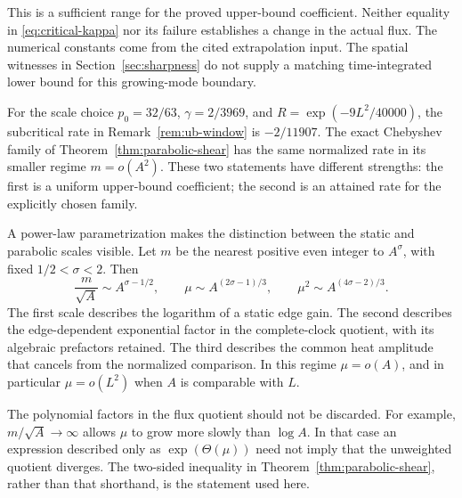 This is a sufficient range for the proved upper-bound coefficient.
Neither equality in \eqref{eq:critical-kappa} nor its failure establishes
a change in the actual flux. The numerical constants come from the cited
extrapolation input. The spatial witnesses in
Section~\ref{sec:sharpness} do not supply a matching time-integrated
lower bound for this growing-mode boundary.

For the scale choice
\(p_0=32/63\), \(\gamma=2/3969\), and
\(R=\exp(-9L^2/40000)\), the subcritical rate in
Remark~\ref{rem:ub-window} is \(-2/11907\). The exact Chebyshev family
of Theorem~\ref{thm:parabolic-shear} has the same normalized rate in
its smaller regime \(m=o(A^2)\). These two statements have different
strengths: the first is a uniform upper-bound coefficient; the second
is an attained rate for the explicitly chosen family.

A power-law parametrization makes the distinction between the static
and parabolic scales visible. Let \(m\) be the nearest positive even
integer to \(A^\sigma\), with fixed \(1/2<\sigma<2\). Then
\begin{equation}\label{eq:power-law-regimes}
 \frac{m}{\sqrt A}\sim A^{\sigma-1/2},\qquad
 \mu\sim A^{(2\sigma-1)/3},\qquad
 \mu^2\sim A^{(4\sigma-2)/3}.
\end{equation}
The first scale describes the logarithm of a static edge gain.
The second describes the edge-dependent exponential factor in the
complete-clock quotient, with its algebraic prefactors retained.
The third describes the common heat amplitude that cancels from the
normalized comparison. In this regime \(\mu=o(A)\), and in particular
\(\mu=o(L^2)\) when \(A\) is comparable with \(L\).

The polynomial factors in the flux quotient should not be discarded.
For example, \(m/\sqrt A\to\infty\) allows \(\mu\) to grow more slowly
than \(\log A\). In that case an expression described only as
\(\exp(\Theta(\mu))\) need not imply that the unweighted quotient
diverges. The two-sided inequality in
Theorem~\ref{thm:parabolic-shear}, rather than that shorthand, is the
statement used here.
